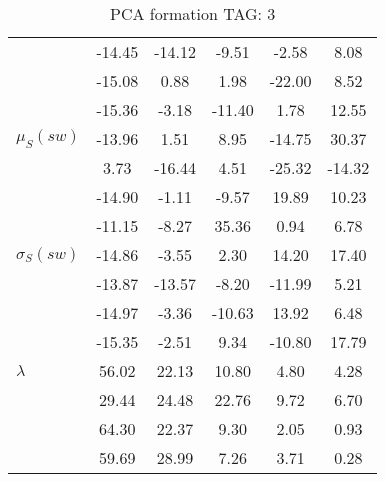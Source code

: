 \begin{table}[h!]
\begin{center}
\begin{tabular}{| l || c | c | c | c | c |}
 & -14.45  & -14.12  & -9.51  & -2.58  & 8.08 \\
 & -15.08  & 0.88  & 1.98  & -22.00  & 8.52 \\
 & -15.36  & -3.18  & -11.40  & 1.78  & 12.55 \\\hline
$\mu_S(sw)$ & -13.96  & 1.51  & 8.95  & -14.75  & 30.37 \\
 & 3.73  & -16.44  & 4.51  & -25.32  & -14.32 \\
 & -14.90  & -1.11  & -9.57  & 19.89  & 10.23 \\
 & -11.15  & -8.27  & 35.36  & 0.94  & 6.78 \\\hline
$\sigma_S(sw)$ & -14.86  & -3.55  & 2.30  & 14.20  & 17.40 \\
 & -13.87  & -13.57  & -8.20  & -11.99  & 5.21 \\
 & -14.97  & -3.36  & -10.63  & 13.92  & 6.48 \\
 & -15.35  & -2.51  & 9.34  & -10.80  & 17.79 \\\hline\hline
$\lambda$ & 56.02  & 22.13  & 10.80  & 4.80  & 4.28 \\
 & 29.44  & 24.48  & 22.76  & 9.72  & 6.70 \\
 & 64.30  & 22.37  & 9.30  & 2.05  & 0.93 \\
 & 59.69  & 28.99  & 7.26  & 3.71  & 0.28 \\\hline
\end{tabular}
\caption{PCA formation TAG: 3}
\end{center}
\end{table}